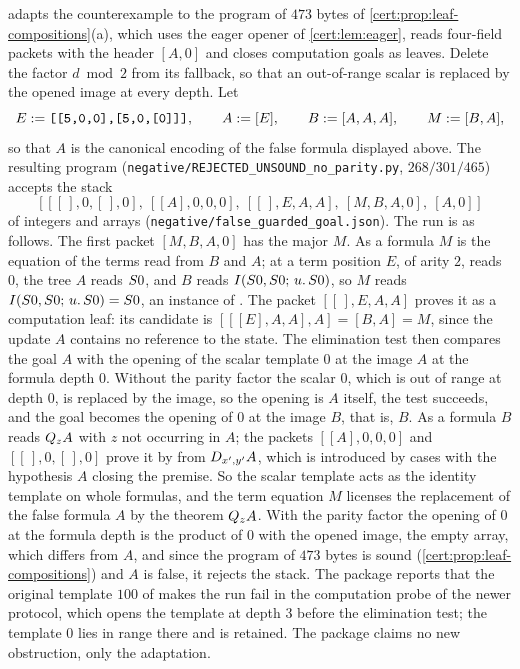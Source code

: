  adapts the counterexample to the program of
$473$ bytes of \cref{cert:prop:leaf-compositions}(a), which uses the eager
opener of \cref{cert:lem:eager}, reads four-field packets with the header
$[A,0]$ and closes computation goals as leaves. Delete the factor $d\bmod 2$
from its fallback, so that an out-of-range scalar is replaced by the opened
image at every depth. Let
\[
E\mathrel{:=}\texttt{[[5,0,0],[5,0,[0]]]},\qquad A\mathrel{:=}[E],\qquad
B\mathrel{:=}[A,A,A],\qquad M\mathrel{:=}[B,A],
\]
so that $A$ is the canonical encoding of the false formula displayed above.
The resulting program (\texttt{negative/REJECTED\_UNSOUND\_no\_parity.py},
$268/301/465$) accepts the stack
\[
\bigl[\,[[\,],0,[\,],0],\ [[A],0,0,0],\ [[\,],E,A,A],\ [M,B,A,0],\ [A,0]\,\bigr]
\]
of integers and arrays (\texttt{negative/false\_guarded\_goal.json}). The run is as follows. The first packet
$[M,B,A,0]$ has the major $M$. As a formula $M$ is the equation of the terms
read from $B$ and $A$; at a term position $E$, of arity $2$, reads $0$, the
tree $A$ reads $S 0$, and $B$ reads $I(S 0,S 0;\,u.\,S 0)$, so
$M$ reads $I(S 0,S 0;\,u.\,S 0)=S 0$, an instance of
. The packet $[[\,],E,A,A]$ proves it as a computation leaf: its
candidate is $[[[E],A,A],A]=[B,A]=M$, since the update $A$ contains no
reference to the state. The elimination test then compares the goal $A$ with
the opening of the scalar template $0$ at the image $A$ at the formula depth
$0$. Without the parity factor the scalar $0$, which is out of range at depth
$0$, is replaced by the image, so the opening is $A$ itself, the test
succeeds, and the goal becomes the opening of $0$ at the image $B$, that is,
$B$. As a formula $B$ reads $Q_{z}A$ with $z$ not occurring in $A$; the
packets $[[A],0,0,0]$ and $[[\,],0,[\,],0]$ prove it by  from
$D_{x',y'}A$, which is introduced by cases with the hypothesis $A$ closing
the premise. So the scalar template acts as the identity template on whole
formulas, and the term equation $M$ licenses the replacement of the false
formula $A$ by the theorem $Q_{z}A$. With the parity factor the opening of $0$
at the formula depth is the product of $0$ with the opened image, the empty
array, which differs from $A$, and since the program of $473$ bytes is sound
(\cref{cert:prop:leaf-compositions}) and $A$ is false, it rejects the stack.
The package reports that the original template $100$ of 
makes the run fail in the computation probe of the newer protocol, which opens
the template at depth $3$ before the elimination test; the template $0$ lies in
range there and is retained. The package claims no new
obstruction, only the adaptation.

